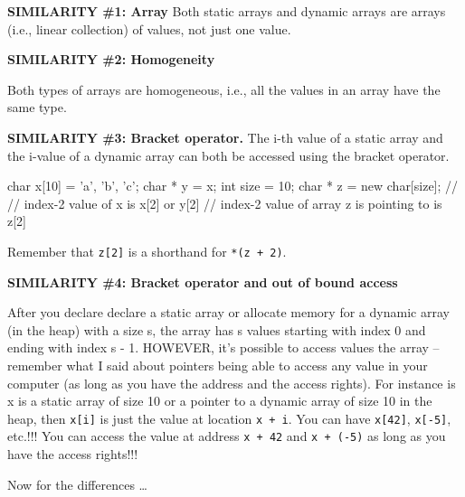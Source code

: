 \textbf{SIMILARITY \#1: Array}
Both static arrays and dynamic arrays are arrays (i.e., linear collection) of values, not just one value.

\textbf{SIMILARITY \#2: Homogeneity}                                           

Both types of arrays are homogeneous, i.e., all the values in an array have the same type.

\textbf{SIMILARITY \#3: Bracket operator.}
The i-th value of a static array and the i-value of a dynamic array can
both be accessed using the bracket operator.

\begin{consolethree}[escapeinside=||]
char x[10] = {'a', 'b', 'c'};
char * y = x;
int size = 10;
char * z = new char[size];
//
// index-2 value of x is x[2] or y[2]
// index-2 value of array z is pointing to is z[2]
\end{consolethree}

Remember that \texttt{z[2]} is a shorthand for \texttt{*(z + 2)}.

\textbf{SIMILARITY \#4: Bracket operator and out of bound access}                      

After you declare declare a static array or allocate memory for a dynamic array (in the heap) with a size s, the array has s values starting with index 0 and ending with index s - 1. HOWEVER, it's possible to access values  the array -- remember what I said about pointers being able to access any value in your computer (as long as you have the address and the access rights). For instance is x is a static array of size 10 or a pointer to a dynamic array of size 10 in the heap, then \texttt{x[i]} is just the value at location \texttt{x + i}. You can have \texttt{x[42]}, \texttt{x[-5]}, etc.!!! You can access the value at address \texttt{x + 42} and \texttt{x + (-5)} as long as you have the access rights!!!

Now for the differences \ldots{}

